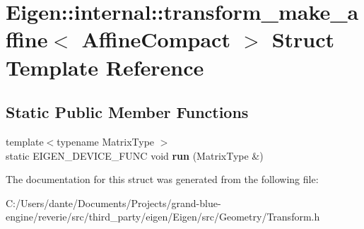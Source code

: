 \hypertarget{struct_eigen_1_1internal_1_1transform__make__affine_3_01_affine_compact_01_4}{}\section{Eigen\+::internal\+::transform\+\_\+make\+\_\+affine$<$ Affine\+Compact $>$ Struct Template Reference}
\label{struct_eigen_1_1internal_1_1transform__make__affine_3_01_affine_compact_01_4}
\subsection*{Static Public Member Functions}
\begin{DoxyCompactItemize}
\item 
\mbox{\label{struct_eigen_1_1internal_1_1transform__make__affine_3_01_affine_compact_01_4_a0c000f1bea35b59cf9ee9a2bd23d297d}} 
{\footnotesize template$<$typename Matrix\+Type $>$ }\\static E\+I\+G\+E\+N\+\_\+\+D\+E\+V\+I\+C\+E\+\_\+\+F\+U\+NC void {\bfseries run} (Matrix\+Type \&)
\end{DoxyCompactItemize}


The documentation for this struct was generated from the following file\+:\begin{DoxyCompactItemize}
\item 
C\+:/\+Users/dante/\+Documents/\+Projects/grand-\/blue-\/engine/reverie/src/third\+\_\+party/eigen/\+Eigen/src/\+Geometry/Transform.\+h\end{DoxyCompactItemize}
